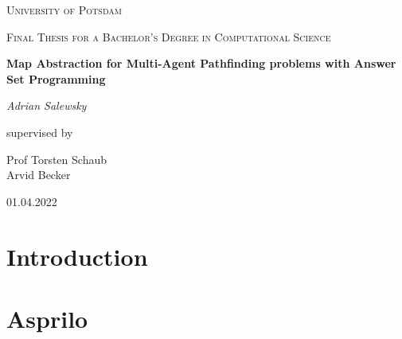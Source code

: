 \documentclass[runningheads]{llncs}
\begin{document}
\begin{titlepage}
\centering
{\scshape\LARGE University of Potsdam \par}
\vspace{1cm}
{\scshape\Large Final Thesis for a Bachelor's Degree in Computational Science\par}
\vspace{1.5cm}
{\huge\bfseries Map Abstraction for Multi-Agent Pathfinding problems with Answer Set Programming\par}
\vspace{2cm}
{\Large\itshape Adrian Salewsky\par}
\vfill
supervised by\par 
\vspace{\baselineskip}
Prof Torsten Schaub \\
\vspace{\baselineskip}
Arvid Becker
\vfill
{01.04.2022 \par}


\begin{abstract}
\end{abstract}
\end{titlepage}


\section{Introduction}

\section{Asprilo}
\end{document}
